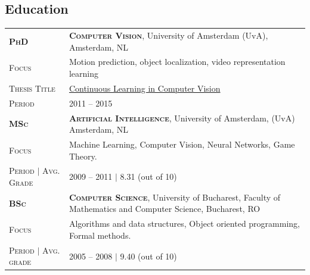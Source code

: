 \documentclass[a4paper, oneside, final]{scrartcl}
\newcommand{\gray}{\rowcolor[gray]{.90}}
\begin{document}
\begin{center}
		\section{Education}
        \begin{tabular}{p{3.5cm}@{\hskip 0.3in}p{12.3cm}}
			\gray \textsc{\textbf{PhD}}     & \textbf{\textsc{Computer Vision}}, University of Amsterdam (UvA), Amsterdam, NL\\
			\textsc{Focus}                  & Motion prediction, object localization, video representation learning \\
			\textsc{Thesis Title}           & {\href{http://dare.uva.nl/search?identifier=90ad88f5-c16e-4450-86f2-23faa250fcab}{Continuous Learning in Computer Vision}}\\
            \textsc{Period}                 & \textsc{2011 -- 2015}
            \vspace{5px}\\
			\gray \textsc{\textbf{MSc}}         & \textbf{\textsc{Artificial Intelligence}}, University of Amsterdam, (UvA) Amsterdam, NL\\
			\textsc{Focus}                      & Machine Learning, Computer Vision, Neural Networks, Game Theory.\\
            \textsc{Period} $\mid$ \textsc{Avg. Grade}   & \textsc{2009  -- 2011} $|$ 8.31 (out of 10)
            \vspace{5px}\\
			\gray \textsc{\textbf{BSc}}         & \textbf{\textsc{Computer Science}}, University of Bucharest, Faculty of Mathematics and Computer Science, Bucharest, RO\\
			\textsc{Focus}                      & Algorithms and data structures, Object oriented programming, Formal methods.\\ 
            \textsc{Period} $\mid$ \textsc{Avg. grade}   & \textsc{2005 -- 2008} $|$ 9.40 (out of 10)
		\end{tabular}


\end{center}
\end{document}
